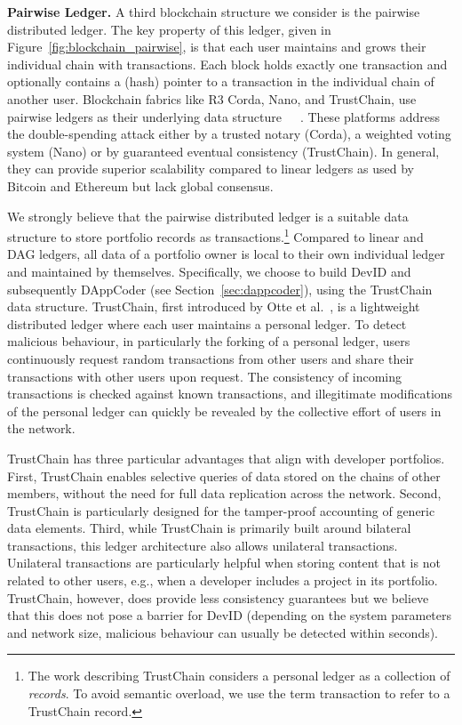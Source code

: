 \textbf{Pairwise Ledger.} A third blockchain structure we consider is the pairwise distributed ledger.
The key property of this ledger, given in Figure~\ref{fig:blockchain_pairwise}, is that each user maintains and grows their individual chain with transactions.
Each block holds exactly one transaction and optionally contains a (hash) pointer to a transaction in the individual chain of another user.
Blockchain fabrics like R3 Corda, Nano, and TrustChain, use pairwise ledgers as their underlying data structure~\cite{otte2017trustchain}~\cite{lemahieu2017raiblocks}~\cite{brown2017introducing}.
These platforms address the double-spending attack either by a trusted notary (Corda), a weighted voting system (Nano) or by guaranteed eventual consistency (TrustChain).
In general, they can provide superior scalability compared to linear ledgers as used by Bitcoin and Ethereum but lack global consensus.

We strongly believe that the pairwise distributed ledger is a suitable data structure to store portfolio records as transactions.\footnote{The work describing TrustChain considers a personal ledger as a collection of \emph{records}. To avoid semantic overload, we use the term transaction to refer to a TrustChain record.}
Compared to linear and DAG ledgers, all data of a portfolio owner is local to their own individual ledger and maintained by themselves.
Specifically, we choose to build DevID and subsequently DAppCoder (see Section~\ref{sec:dappcoder}), using the TrustChain data structure.
TrustChain, first introduced by Otte et al.~\cite{otte2017trustchain}, is a lightweight distributed ledger where each user maintains a personal ledger.
To detect malicious behaviour, in particularly the forking of a personal ledger, users continuously request random transactions from other users and share their transactions with other users upon request.
The consistency of incoming transactions is checked against known transactions, and illegitimate modifications of the personal ledger can quickly be revealed by the collective effort of users in the network.

TrustChain has three particular advantages that align with developer portfolios.
First, TrustChain enables selective queries of data stored on the chains of other members, without the need for full data replication across the network.
Second, TrustChain is particularly designed for the tamper-proof accounting of generic data elements.
Third, while TrustChain is primarily built around bilateral transactions, this ledger architecture also allows unilateral transactions.
Unilateral transactions are particularly helpful when storing content that is not related to other users, e.g., when a developer includes a project in its portfolio.
TrustChain, however, does provide less consistency guarantees but we believe that this does not pose a barrier for DevID (depending on the system parameters and network size, malicious behaviour can usually be detected within seconds).

